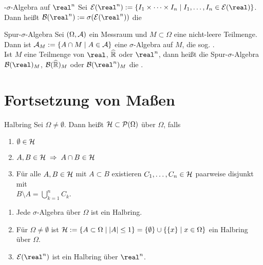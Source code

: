 \begin{Def}{-$\sigma$-Algebra auf $\real^n$}
    Sei $\E(\real^n) :=
    \{I_1 \times \dotsb \times I_n \;|\; I_1, \dotsc, I_n \in \E(\real)\}$.\\
    Dann heißt $\B(\real^n) := \sigma(\E(\real^n))$ die
\end{Def}

\begin{Def}{Spur-$\sigma$-Algebra}
    Sei $(\Omega, \mathcal{A})$ ein Messraum und $M \subset \Omega$ eine nicht-leere Teilmenge.\\
    Dann ist $\mathcal{A}_M := \{A \cap M \;|\; A \in \mathcal{A}\}$ eine $\sigma$-Algebra auf $M$,
    die sog. .\\
    Ist $M$ eine Teilmenge von $\real$, $\widehat{\mathbb{R}}$ oder $\real^n$,
    dann heißt die Spur-$\sigma$-Algebra $\B(\real)_M$, $\mathcal{B}(\widehat{\mathbb{R}})_M$ oder $\B(\real^n)_M$
    die .
\end{Def}

\section{%
    Fortsetzung von Maßen%
}

\begin{Def}{Halbring}
    Sei $\Omega \not= \emptyset$.
    Dann heißt $\mathcal{H} \subset \mathcal{P}(\Omega)$  über $\Omega$, falls
    \begin{enumerate}
        \item
        $\emptyset \in \mathcal{H}$

        \item
        $A, B \in \mathcal{H} \;\Rightarrow\; A \cap B \in \mathcal{H}$

        \item
        Für alle $A, B \in \mathcal{H}$ mit $A \subset B$ existieren $C_1, \dotsc, C_n \in \mathcal{H}$
        paarweise disjunkt mit\\
        $B \setminus A = \bigcup_{k=1}^n C_k$.
    \end{enumerate}
\end{Def}

\begin{Bsp}
    \begin{enumerate}
        \item
        Jede $\sigma$-Algebra über $\Omega$ ist ein Halbring.

        \item
        Für $\Omega \not= \emptyset$ ist $\mathcal{H} := \{A \subset \Omega \;|\; |A| \le 1\} =
        \{\emptyset\} \cup \{\{x\} \;|\; x \in \Omega\}$ ein Halbring über $\Omega$.

        \item
        $\E(\real^n)$ ist ein Halbring über $\real^n$.
    \end{enumerate}
\end{Bsp}

